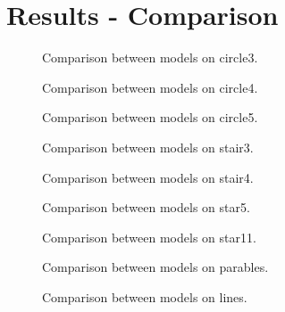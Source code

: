 \section{Results - Comparison}
\begin{figure}[h!]
         \centering
         
         \caption{Comparison between models on circle3.}
\end{figure}
\begin{figure}[h!]
         \centering
         
         \caption{Comparison between models on circle4.}
\end{figure}
\begin{figure}[h!]
         \centering
         
         \caption{Comparison between models on circle5.}
\end{figure}
\begin{figure}[h!]
         \centering
         
         \caption{Comparison between models on stair3.}
\end{figure}
\begin{figure}[h!]
         \centering
         
         \caption{Comparison between models on stair4.}
\end{figure}
\begin{figure}[h!]
         \centering
         
         \caption{Comparison between models on star5.}
\end{figure}
\begin{figure}[h!]
         \centering
         
         \caption{Comparison between models on star11.}
\end{figure}
\begin{figure}[h!]
         \centering
         
         \caption{Comparison between models on parables.}
\end{figure}
\begin{figure}[h!]
         \centering
         
         \caption{Comparison between models on lines.}
\end{figure}
\clearpage